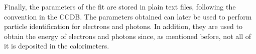     Finally, the parameters of the fit are stored in plain text files, following the convention in the CCDB.
    The parameters obtained can later be used to perform particle identification for electrons and photons.
    In addition, they are used to obtain the energy of electrons and photons since, as mentioned before, not all of it is deposited in the calorimeters.

